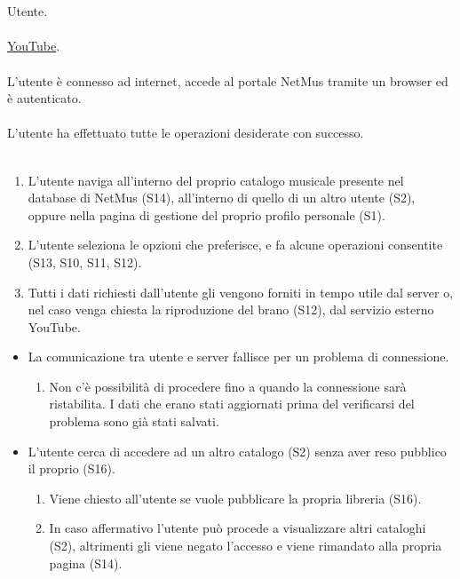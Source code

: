 \newpage
\vspace*{0.5cm}
 \\\\
 Utente. \\\\
 \underline{YouTube}. \\\\
 L'utente \`e connesso ad internet, accede al portale
NetMus tramite un browser ed  \`e autenticato. \\\\ 
 L'utente ha effettuato tutte le operazioni desiderate
con successo. \\\\
\begin{enumerate}
  \item L'utente naviga all'interno del proprio catalogo musicale presente nel
  database di NetMus (S14), all'interno di quello di un altro utente
  (S2), oppure nella pagina di gestione del proprio profilo personale (S1).
  \item L'utente seleziona le opzioni che preferisce, e fa alcune operazioni
  consentite (S13, S10, S11, S12).
  \item Tutti i dati richiesti dall'utente gli vengono forniti in tempo utile
  dal server o, nel caso venga chiesta la riproduzione del brano (S12), dal
  servizio esterno YouTube.
\end{enumerate}
\begin{itemize}
  \item La comunicazione tra utente e server fallisce per un problema di
  connessione.
  \begin {enumerate}
    \item Non c'\`e possibilit\`a di procedere fino a quando la connessione sar\`a
    ristabilita. I dati che erano stati aggiornati prima del verificarsi del
    problema sono gi\`a stati salvati.
  \end{enumerate}
  \item L'utente cerca di accedere ad un altro catalogo (S2) senza aver reso
  pubblico il proprio (S16).
  \begin {enumerate}
    \item Viene chiesto all'utente se vuole pubblicare la propria libreria
    (S16).
    \item In caso affermativo l'utente pu\`o procede a visualizzare altri
    cataloghi (S2), altrimenti gli viene negato l'accesso e viene rimandato alla
    propria pagina (S14).
  \end{enumerate}
\end{itemize}
\newpage

